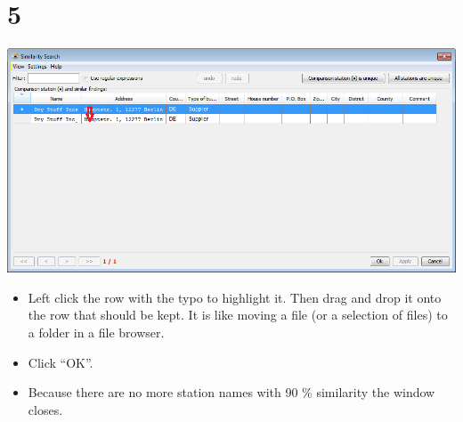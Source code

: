 \documentclass[10pt]{beamer}
\begin{document}
\section{5}
\begin{frame}
	\begin{center}
			\includegraphics[scale=0.4]{5.png}
	\end{center}
	\begin{itemize}
		\item Left click the row with the typo to highlight it. Then drag and drop it onto the row that should be kept. It is like moving a file (or a selection of files) to a folder in a file browser.
		\item Click ``OK''.
		\item Because there are no more station names with 90 \% similarity the window closes.
	\end{itemize}
\end{frame}
\end{document}
